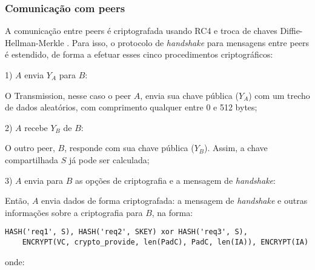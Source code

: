 
\subsubsection*{Comunicação com peers}

A comunicação entre \glspl*{peer} é criptografada usando RC4 e troca de chaves
Diffie-Hellman-Merkle \cite{wikivuze:encription}. Para isso, o protocolo de
\emph{handshake} para mensagens entre \glspl*{peer} é estendido, de forma a efetuar
esses cinco procedimentos criptográficos:


1) $A$ envia $Y_A$ para $B$:

O Transmission, nesse caso o \gls*{peer} $A$, envia sua chave pública ($Y_A$) com um
trecho de dados aleatórios, com comprimento qualquer entre 0 e 512 bytes;


2) $A$ recebe $Y_B$ de $B$:

O outro \gls*{peer}, $B$, responde com sua chave pública ($Y_B$). Assim, a chave
compartilhada $S$ já pode ser calculada;


3) $A$ envia para $B$ as opções de criptografia e a mensagem de \emph{handshake}:

Então, $A$ envia dados de forma criptografada: a mensagem de \emph{handshake} e outras
informações sobre a criptografia para $B$, na forma:

\begin{verbatim}
HASH('req1', S), HASH('req2', SKEY) xor HASH('req3', S),
    ENCRYPT(VC, crypto_provide, len(PadC), PadC, len(IA)), ENCRYPT(IA)
\end{verbatim}

\newpage
onde:

